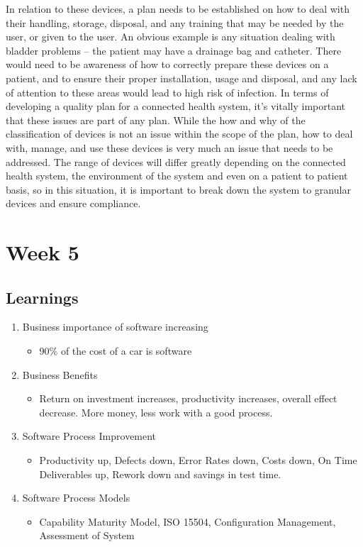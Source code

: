 In relation to these devices, a plan needs to be established on how to deal with their handling, storage, disposal, and any training that may be needed by the user, or given to the user. An obvious example is any situation dealing with bladder problems – the patient may have a drainage bag and catheter. There would need to be awareness of how to correctly prepare these devices on a patient, and to ensure their proper installation, usage and disposal, and any lack of attention to these areas would lead to high risk of infection. In terms of developing a quality plan for a connected health system, it’s vitally important that these issues are part of any plan. While the how and why of the classification of devices is not an issue within the scope of the plan, how to deal with, manage, and use these devices is very much an issue that needs to be addressed. The range of devices will differ greatly depending on the connected health system, the environment of the system and even on a patient to patient basis, so in this situation, it is important to break down the system to granular devices and ensure compliance.

\chapter{Week 5}

\section{Learnings}
\begin{enumerate}
\item Business importance of software increasing
\begin{itemize}
\item 90\% of the cost of a car is software
\end{itemize}
\item Business Benefits
\begin{itemize}
\item Return on investment increases, productivity increases, overall effect decrease. More money, less work with a good process.
\end{itemize}
\item Software Process Improvement
\begin{itemize}
\item Productivity up, Defects down, Error Rates down, Costs down, On Time Deliverables up, Rework down and savings in test time. 
\end{itemize}
\item Software Process Models
\begin{itemize}
\item Capability Maturity Model, ISO 15504, Configuration Management, Assessment of System
\end{itemize}
\end{enumerate}

